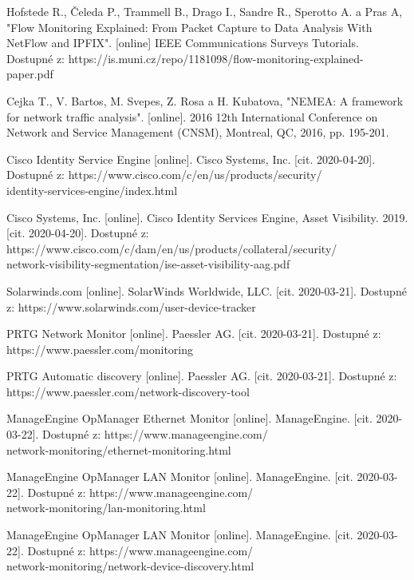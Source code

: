 \documentclass[thesis=B,czech,hidelinks]{FITthesis}[2019/03/21]
\begin{document}
\begin{thebibliography}{99}
     Hofstede R., Čeleda P., Trammell B., Drago I., Sandre R., Sperotto A. a Pras A, "Flow Monitoring Explained: From Packet Capture to Data Analysis With NetFlow and IPFIX". [online] IEEE Communications Surveys Tutorials. Dostupné z: https://is.muni.cz/repo/1181098/flow-monitoring-explained-paper.pdf
    
     Cejka T., V. Bartos, M. Svepes, Z. Rosa a H. Kubatova, "NEMEA: A framework for network traffic analysis". [online]. 2016 12th International Conference on Network and Service Management (CNSM), Montreal, QC, 2016, pp. 195-201.
    
     Cisco Identity Service Engine [online]. Cisco Systems, Inc. [cit. 2020-04-20]. Dostupné z: https://www.cisco.com/c/en/us/products/security/\\identity-services-engine/index.html
    
     Cisco Systems, Inc. [online]. Cisco Identity Services Engine, Asset Visibility. 2019. [cit. 2020-04-20]. Dostupné z: https://www.cisco.com/c/dam/en/us/products/collateral/security/\\network-visibility-segmentation/ise-asset-visibility-aag.pdf
    
     Solarwinds.com [online]. SolarWinds Worldwide, LLC. [cit. 2020-03-21]. Dostupné z: https://www.solarwinds.com/user-device-tracker
    
     PRTG Network Monitor [online]. Paessler AG. [cit. 2020-03-21]. Dostupné z: https://www.paessler.com/monitoring
    
     PRTG Automatic discovery [online]. Paessler AG. [cit. 2020-03-21]. Dostupné z: https://www.paessler.com/network-discovery-tool
    
     ManageEngine OpManager Ethernet Monitor [online]. ManageEngine. [cit. 2020-03-22]. Dostupné z: https://www.manageengine.com/\\network-monitoring/ethernet-monitoring.html
    
     ManageEngine OpManager LAN Monitor [online]. ManageEngine. [cit. 2020-03-22]. Dostupné z: https://www.manageengine.com/\\network-monitoring/lan-monitoring.html
    
     ManageEngine OpManager LAN Monitor [online]. ManageEngine. [cit. 2020-03-22]. Dostupné z: https://www.manageengine.com/\\network-monitoring/network-device-discovery.html
    

\end{thebibliography}
\end{document}
